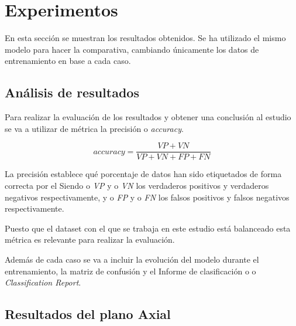 \section{Experimentos}\label{sec:experimentos}
En esta sección se muestran los resultados obtenidos.
Se ha utilizado el mismo modelo para hacer la comparativa, cambiando únicamente los datos de entrenamiento en base a
cada caso.

\subsection{Análisis de resultados}\label{subsec:analisis-de-resultados}
Para realizar la evaluación de los resultados y obtener una conclusión al estudio se va a utilizar de
métrica la precisión o \textit{accuracy}.

    \[accuracy=\frac{VP+VN}{VP+VN+FP+FN}\]

La precisión establece qué porcentaje de datos han sido etiquetados de forma correcta por el
Siendo o \textit{VP} y o \textit{VN} los verdaderos positivos y verdaderos negativos respectivamente,
y o \textit{FP} y o \textit{FN} los falsos positivos y falsos negativos respectivamente.

Puesto que el dataset con el que se trabaja en este estudio está balanceado esta métrica es relevante para realizar
la evaluación.

Además de cada caso se va a incluir la evolución del modelo durante el entrenamiento, la matriz de confusión y el
Informe de clasificación o o \textit{Classification Report}.


\subsection{Resultados del plano Axial}\label{subsec:resultados-del-plano-axial}

